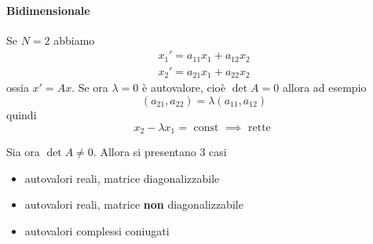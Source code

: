 \paragraph{Bidimensionale} Se \(N = 2\) abbiamo
\begin{align*}
    x_{1}' = a_{11}x_{1} + a_{12}x_{2} \\ x_{2}' = a_{21}x_{1} + a_{22}x_{2}
\end{align*}
ossia \(x' = Ax\).
Se ora \(\lambda= 0\) è autovalore, cioè \(\det A = 0\) allora ad esempio
\[
  {(a_{21}, a_{22} )} = \lambda{(a_{11} , a_{12} )}
\]
quindi
\[
  x_{2} - \lambda x_{1} = \text{ const } \implies \text{ rette }
\]

Sia ora \(\det A \neq 0\). Allora si presentano 3 casi
\begin{itemize}[label = --]
    \item autovalori reali, matrice diagonalizzabile
    \item autovalori reali, matrice \textbf{non} diagonalizzabile
    \item autovalori complessi coniugati
\end{itemize}


